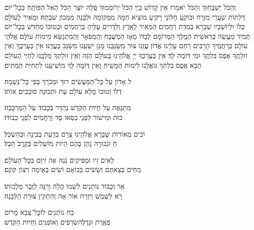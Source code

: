 וְהַכֹּל יְשַׁבְּחֽוּךָ \middot וְהַכֹּל יֹאמְרוּ אֵין קָדוֹשׁ כַּיָי׃ הַכֹּל יְרוֹמְמֽוּךָ סֶּֽלָה יוֹצֵר הַכֹּל \middot הָאֵל הַפּוֹתֵֽחַ בְּכׇל־יוֹם דַּלְתוֹת שַׁעֲרֵי מִזְרָח \middot וּבוֹקֵֽעַ חַלּוֹנֵי רָקִֽיעַ מוֹצִיא חַמָּה מִמְּקוֹמָהּ וּלְבָנָה מִמְּכוֹן שִׁבְתָּהּ׃ וּמֵאִיר לָעוֹלָם כֻּלּוֹ וּלְיוֹשְׁבָיו שֶׁבָּרָא בְּמִדַּת רַחֲמִים׃ 
הַמֵּאִיר לָאָֽרֶץ וְלַדָּרִים עָלֶֽיהָ בְּרַחֲמִים \middot וּבְטוּבוֹ מְחַדֵּשׁ בְּכׇל־יוֹם תָּמִיד מַעֲשֵׂה בְרֵאשִׁית׃
הַמֶּֽלֶךְ הַמְּרוֹמָם לְבַדּוֹ מֵאָז \middot הַמְשֻׁבָּח וְהַמְפֹאָר וְהַמִּתְנַשֵּׂא מִימוֹת עוֹלָם׃
אֱלֹהֵי עוֹלָם בְּרַחֲמֶֽיךָ הָרַבִּים רַחֵם עָלֵֽינוּ \middot אֲדוֹן עֻזֵּֽנוּ צוּר מִשְׂגַּבֵּֽנוּ מָגֵן יִשְׁעֵֽנוּ מִשְׂגָּב בַּעֲדֵֽנוּ׃
אֵין כְּעֶרְכֶּֽךָ וְאֵין זוּלָתֶֽךָ \middot אֶפֶס בִּלְתֶּֽךָ וּמִי דּֽוֹמֶה לָּךְ׃
אֵין כְּעֶרְכְּךָ יְיָ אֱלֹהֵֽינוּ בָּעוֹלָם הַזֶּה \middot וְאֵין זוּלָתְךָ מַלְכֵּֽנוּ לְחַיֵּי הָעוֹלָם הַבָּא׃
אֶֽפֶס בִּלְתְּךָ גּוֹאֲלֵֽנוּ לִימוֹת הַמָּשִֽׁיחַ \middot וְאֵין דּֽוֹמֶה לְּךָ מוֹשִׁיעֵֽנוּ לִתְחִיַּת הַמֵּתִים׃

ל אָדוֹן עַל כׇּל־הַמַּעֲשִׂים \hfill {}רוּךְ וּמְבֹרָךְ בְּפִי כׇּל־נְשָׁמָה׃ \\
דְלוֹ וְטוּבוֹ מָלֵא עוֹלָם \hfill {}עַת וּתְבוּנָה סוֹבְבִים אוֹתוֹ׃

מִּתְגָּאֶה עַל חַיּוֹת הַקֹּֽדֶשׁ \hfill {}נֶהְדָּר בְּכָבוֹד עַל הַמֶּרְכָּבָה׃\\
כוּת וּמִישׁוֹר לִפְנֵי כִסְאוֹ \hfill {}סֶד וְרַחֲמִים לִפְנֵי כְבוֹדוֹ׃

וֹבִים מְאוֹרוֹת שֶׁבָּרָא אֱלֹהֵֽינוּ \hfill {}צָרָם בְּדַֽעַת בְּבִינָה וּבְהַשְׂכֵּל׃\\
חַ וּגְבוּרָה נָתַן בָּהֶם \hfill {}הְיוֹת מוֹשְׁלִים בְּקֶֽרֶב תֵּבֵל׃

לֵאִים זִיו וּמְפִיקִים נֹֽגַהּ \hfill {}אֶה זִיוָם בְּכׇל־הָעוֹלָם׃ \\
מֵחִים בְּצֵאתָם וְשָׂשִׂים בְּבוֹאָם \hfill {}וֹשִׂים בְּאֵימָה רְצוֹן קוׂנָם׃

אֵר וְכָבוֹד נוֹתְנִים לִשְׁמוֹ \hfill {}הֳלָה וְרִנָּה לְזֵֽכֶר מַלְכוּתוֹ׃ \\
רָא לַשֶּֽׁמֶשׁ וַיִּזְרַח אוֹר \hfill {}אָה וְהִתְקִין צוּרַת הַלְּבָנָה׃

בַח נוֹתְנִים לוֹ\hfill כׇּל־צְבָא מָרוֹם \\ פְאֶֽרֶת וּגְדֻלָּה\hfill שְׂרָפִים וְאוֹפַנִּים וְחַיּוֹת הַקֹּֽדֶשׁ׃

